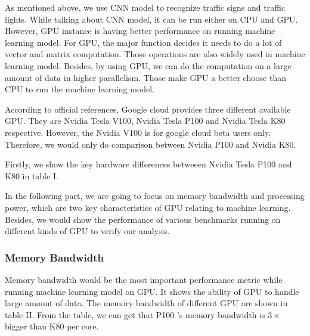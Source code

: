 \documentclass[conference]{IEEEtran}
\begin{document}
As mentioned above, we use CNN model to recognize traffic signs and traffic lights. While talking about CNN model, it can be run either on CPU and GPU. However, GPU instance is having better performance on running machine learning model. For GPU, the major function decides it needs to do a lot of vector and matrix computation. Those operations are also widely used in machine learning model. Besides, by using GPU, we can do the computation on a large amount of data in higher parallelism. Those make GPU a better choose than CPU to run the machine learning model.   

According to official references, Google cloud provides three different available GPU. They are Nvidia Tesla V100, Nvidia Tesla P100 and Nvidia Tesla K80 respective. However, the Nvidia V100 is for google cloud beta users only. Therefore, we would only do comparison between Nvidia P100 and Nvidia K80.




Firstly, we show the key hardware differences betweeen Nvidia Tesla P100 and K80 in table I.

In the following part, we are going to focus on memory bandwidth and processing power, which are two key characteristics of GPU relating to machine learning. Besides, we would show the performance of various benchmarks running on different kinds of GPU to verify our analysis. 

\subsubsection{Memory Bandwidth}
Memory bandwidth would be the most important performance metric while running machine learning model on GPU. It shows the ability of GPU to handle large amount of data. The memory bandwidth of different GPU are shown in table II. From the table, we can get that P100 's memory bandwidth is $3 \times$ bigger than K80 per core. 
\end{document}

